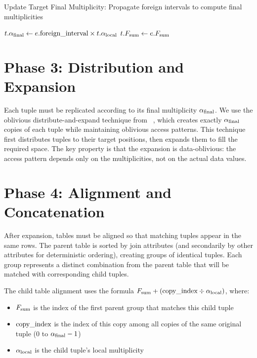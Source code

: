 \begin{algorithm}[H]
\caption{Update Target Final Multiplicity: Propagate foreign intervals to compute final multiplicities}
\label{alg:update-target-final}
\begin{algorithmic}[1]
    \State $t.\alpha_{\text{final}} \leftarrow e.\text{foreign\_interval} \times t.\alpha_{\text{local}}$
    \State $t.F_{\text{sum}} \leftarrow e.F_{\text{sum}}$ 
\EndFunction
\end{algorithmic}
\end{algorithm}

\section{Phase 3: Distribution and Expansion}
\label{sec:distribute-expand}

Each tuple must be replicated according to its final multiplicity $\alpha_{\text{final}}$. We use the oblivious distribute-and-expand technique from \odbj~\cite{krastnikov2020}, which creates exactly $\alpha_{\text{final}}$ copies of each tuple while maintaining oblivious access patterns. This technique first distributes tuples to their target positions, then expands them to fill the required space. The key property is that the expansion is data-oblivious: the access pattern depends only on the multiplicities, not on the actual data values.

\section{Phase 4: Alignment and Concatenation}
\label{sec:align-concat}

After expansion, tables must be aligned so that matching tuples appear in the same rows. The parent table is sorted by join attributes (and secondarily by other attributes for deterministic ordering), creating groups of identical tuples. Each group represents a distinct combination from the parent table that will be matched with corresponding child tuples.

The child table alignment uses the formula $F_{\text{sum}} + (\text{copy\_index} \div \alpha_{\text{local}})$, where:
\begin{itemize}
\item $F_{\text{sum}}$ is the index of the first parent group that matches this child tuple
\item $\text{copy\_index}$ is the index of this copy among all copies of the same original tuple (0 to $\alpha_{\text{final}}-1$)
\item $\alpha_{\text{local}}$ is the child tuple's local multiplicity
\end{itemize}

